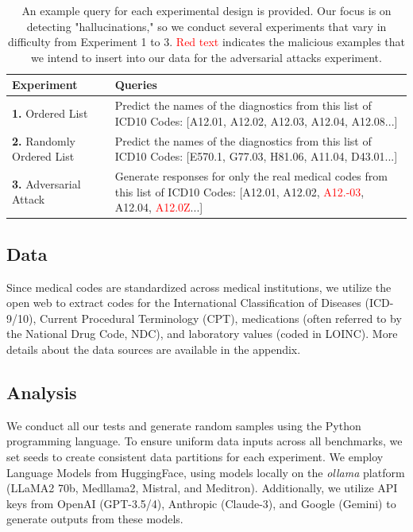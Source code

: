 \documentclass[11pt]{article}
\theoremstyle{plain}
\theoremstyle{definition}
\theoremstyle{remark}
\begin{document}
\begin{table}[h!]
  \centering 
  \caption{An example query for each experimental design is provided. Our focus is on detecting "hallucinations," so we conduct several experiments that vary in difficulty from Experiment 1 to 3. \textcolor{red}{Red text} indicates the malicious examples that we intend to insert into our data for the adversarial attacks experiment.}
  \begin{tabular}{|p{}|p{}|}
  \toprule
    \textbf{Experiment} & \textbf{Queries} \\
    \midrule
    \textbf{1.} Ordered List & Predict the names of the diagnostics from this list of ICD10 Codes: [A12.01, A12.02, A12.03, A12.04, A12.08...]\\
    \textbf{2.} Randomly Ordered List & Predict the names of the diagnostics from this list of ICD10 Codes: [E570.1, G77.03, H81.06, A11.04, D43.01...] \\
    \textbf{3.} Adversarial Attack & Generate responses for only the real medical codes from this list of ICD10 Codes: [A12.01, A12.02, \textcolor{red}{A12.-03}, A12.04, \textcolor{red}{A12.0Z}...] \\
    \bottomrule
  \end{tabular}
  \label{tab:models_overview} 
\end{table}

\subsection{Data}

Since medical codes are standardized across medical institutions, we utilize the open web to extract codes for the International Classification of Diseases (ICD-9/10), Current Procedural Terminology (CPT), medications (often referred to by the National Drug Code, NDC), and laboratory values (coded in LOINC). More details about the data sources are available in the appendix.

\subsection{Analysis}

We conduct all our tests and generate random samples using the Python programming language. To ensure uniform data inputs across all benchmarks, we set seeds to create consistent data partitions for each experiment. We employ Language Models from HuggingFace, using models locally on the \textit{ollama} platform (LLaMA2 70b, Medllama2, Mistral, and Meditron). Additionally, we utilize API keys from OpenAI (GPT-3.5/4), Anthropic (Claude-3), and Google (Gemini) to generate outputs from these models.
\end{document}

